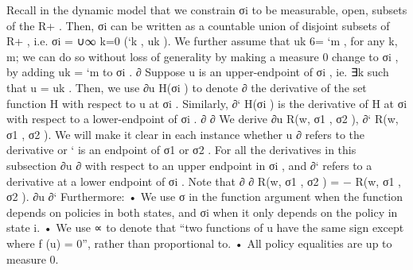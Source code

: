 \documentclass[10pt]{article}
\begin{document}
\begin{ReviewVerbatim}
Recall in the dynamic model that we constrain σi to be measurable, open, subsets of the R+ . Then,
σi can be written as a countable union of disjoint subsets of R+ , i.e. σi = ∪∞
k=0 (`k , uk ). We further
assume that uk 6= `m , for any k, m; we can do so without loss of generality by making a measure 0
change to σi , by adding uk = `m to σi .
∂
Suppose u is an upper-endpoint of σi , ie. ∃k such that u = uk . Then, we use ∂u
H(σi ) to denote
∂
the derivative of the set function H with respect to u at σi . Similarly, ∂` H(σi ) is the derivative of
H at σi with respect to a lower-endpoint of σi .
∂
∂
We derive ∂u
R(w, {σ1 , σ2 }), ∂`
R(w, {σ1 , σ2 }). We will make it clear in each instance whether u
∂
refers to the derivative
or ` is an endpoint of σ1 or σ2 . For all the derivatives in this subsection ∂u
∂
with respect to an upper endpoint in σi , and ∂` refers to a derivative at a lower endpoint of σi .
Note that
∂
∂
R(w, {σ1 , σ2 }) = − R(w, {σ1 , σ2 }).
∂u
∂`
Furthermore:
• We use σ in the function argument when the function depends on policies in both states, and
σi when it only depends on the policy in state i.
• We use ∝ to denote that “two functions of u have the same sign except where f (u) = 0”,
rather than proportional to.
• All policy equalities are up to measure 0.
\end{ReviewVerbatim}
\end{document}
